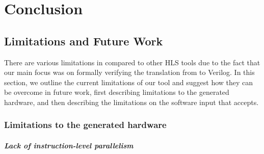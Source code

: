 \chapter{Conclusion}%
\label{sec:conclusion}

\section{Limitations and Future Work}

There are various limitations in \vericert{} compared to other HLS tools due to
the fact that our main focus was on formally verifying the translation from
\rtl{} to Verilog. In this section, we outline the current limitations of our
tool and suggest how they can be overcome in future work, first describing
limitations to the generated hardware, and then describing the limitations on
the software input that \vericert{} accepts.


\subsection{Limitations to the generated hardware}


\paragraph{Lack of instruction-level parallelism}

